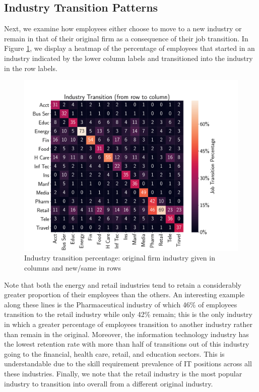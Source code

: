 \documentclass[10pt]{article}
\begin{document}
\subsection{Industry Transition Patterns}

Next, we examine how employees either choose to move to a new industry or remain
in that of their original firm as a consequence of their job transition.  
In Figure \ref{fig:transmat}, we display a heatmap of the percentage of 
employees that started in an industry indicated by the lower column labels and 
transitioned into the industry in the row labels. 
%
\begin{figure}[thb]
    \centering
	\includegraphics[width=1.0\linewidth]{transmat.pdf}
	\caption{Industry transition percentage: original firm 
   industry given in columns and new/same in rows}
	\label{fig:transmat}
\end{figure}
%
Note that both the energy and retail industries tend to retain a considerably 
greater proportion of their employees than the others.  An interesting example 
along these lines is the Pharmaceutical industry of which 46\% of employees 
transition to the retail industry while only 42\% remain; this is the only industry in which 
a greater percentage of employees transition to another industry rather than 
remain in the original.  Moreover, the information technology industry has 
the lowest retention rate with more than half of transitions out of this industry 
going to the financial, health care, retail, and education sectors.  This is understandable 
due to the skill requirement prevalence of IT positions across all these industries.  
Finally, we note that the retail industry is the most popular industry to transition 
into overall from a different original industry.
\end{document}
